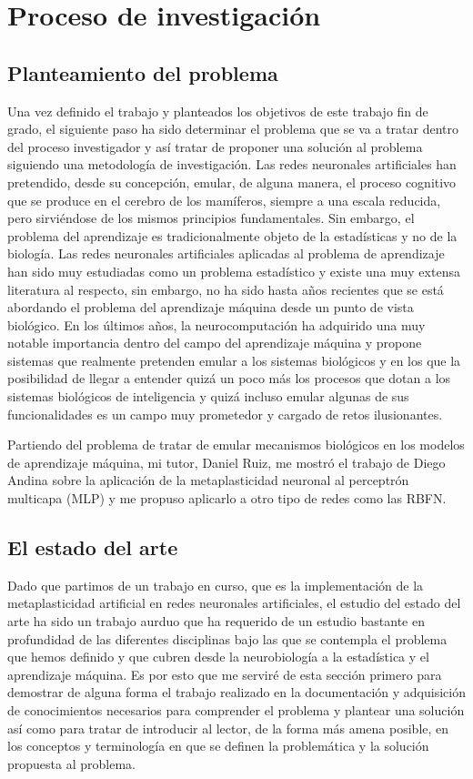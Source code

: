 \documentclass[10pt,a4paper]{report}
\begin{document}
\chapter{Proceso de investigación}
\section{Planteamiento del problema}
Una vez definido el trabajo y planteados los objetivos de este trabajo fin de grado, el siguiente paso ha sido determinar el problema que se va a tratar dentro del proceso investigador y así tratar de proponer una solución al problema siguiendo una metodología de investigación.
Las redes neuronales artificiales han pretendido, desde su concepción, emular, de alguna manera, el proceso cognitivo que se produce en el cerebro de los mamíferos, siempre a una escala reducida, pero sirviéndose de los mismos principios fundamentales. Sin embargo, el problema del aprendizaje es tradicionalmente objeto de la estadísticas y no de la biología. Las redes neuronales artificiales aplicadas al problema de aprendizaje han sido muy estudiadas como un problema estadístico y existe una muy extensa literatura al respecto, sin embargo, no ha sido hasta años recientes que se está abordando el problema del aprendizaje máquina desde un punto de vista biológico. En los últimos años, la neurocomputación ha adquirido una muy notable importancia dentro del campo del aprendizaje máquina y propone sistemas que realmente pretenden emular a los sistemas biológicos y en los que la posibilidad de llegar a entender quizá un poco más los procesos que dotan a los sistemas biológicos de inteligencia y quizá incluso emular algunas de sus funcionalidades es un campo muy prometedor y cargado de retos ilusionantes.

Partiendo del problema de tratar de emular mecanismos biológicos en los modelos de aprendizaje máquina, mi tutor, Daniel Ruiz, me mostró el trabajo de Diego Andina sobre la aplicación de la metaplasticidad neuronal al perceptrón multicapa (MLP) y me propuso aplicarlo a otro tipo de redes como las RBFN.

\section{El estado del arte}
Dado que partimos de un trabajo en curso, que es la implementación de la metaplasticidad artificial en redes neuronales artificiales, el estudio del estado del arte ha sido un trabajo aurduo que ha requerido de un estudio bastante en profundidad de las diferentes disciplinas bajo las que se contempla el problema que hemos definido y que cubren desde la neurobiología a la estadística y el aprendizaje máquina. Es por esto que me serviré de esta sección primero para demostrar de alguna forma el trabajo realizado en la documentación y adquisición de conocimientos necesarios para comprender el problema y plantear una solución así como para tratar de introducir al lector, de la forma más amena posible, en los conceptos y terminología en que se definen la problemática y la solución propuesta al problema.
\end{document}
